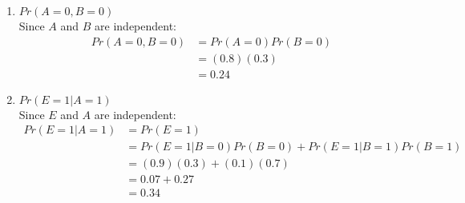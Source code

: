 \documentclass[10.5pt,letterpaper]{article}
\begin{document}
\begin{enumerate}[label=\textbf{Problem \arabic*.}]
\begin{enumerate}[label=\arabic*)]
		\item $Pr(A=0,B=0)$\\
		Since $A$ and $B$ are independent: \\
		\begin{equation}\nonumber\begin{split}
		Pr(A=0,B=0) &= Pr(A=0)Pr(B=0)\\
		&= (0.8)(0.3)\\
		&= \boxed{0.24}
		\end{split}\end{equation}
		\item $Pr(E=1|A=1)$\\
		Since $E$ and $A$ are independent: \\
		\begin{equation}\begin{split}
		Pr(E=1|A=1) &= Pr(E=1)\\
		&= Pr(E=1|B=0)Pr(B=0) + Pr(E=1|B=1)Pr(B=1)\\
		&= (0.9)(0.3) + (0.1)(0.7)\\
		&= 0.07 + 0.27\\
		&= \boxed{0.34}
		\end{split}\end{equation}
	\end{enumerate}
\end{enumerate}
\end{document}
